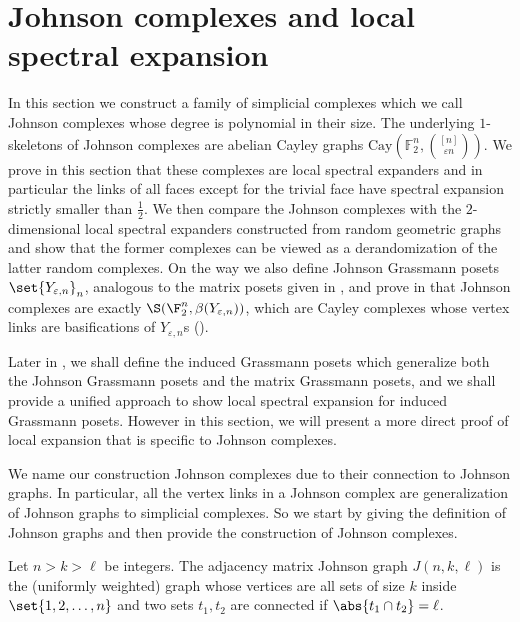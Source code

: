 \newcommand{\0}[0]{\mathbf{0}}
\newcommand{\ot}[0]{\cap}
\newcommand{\co}[1]{C_{#1}} 
\newcommand{\sym}[1]{T_{#1}} 
\newcommand{\oco}[1]{\overline{C_{#1}}} 
\newcommand{\ol}[1]{\overline{#1}}
\newcommand{\cd}[1]{c_{#1}}
\newcommand{\dc}[1]{T_{#1}}


\section{Johnson complexes and local spectral expansion}
\label{sec:spectral-Johnson}
In this section we construct a family of simplicial complexes which we call Johnson complexes whose degree is polynomial in their size. 
The underlying $1$-skeletons of Johnson complexes are abelian Cayley graphs $\mathrm{Cay}(\mathbb{F}_2^n, \binom{[n]}{\varepsilon n})$. 
We prove in this section that these complexes are local spectral expanders and in particular the links of all faces except for the trivial face have spectral expansion strictly smaller than $\frac{1}{2}$.
%
We then compare the Johnson complexes with the $2$-dimensional local spectral expanders constructed from random geometric graphs \cite{LiuMSY2023} and show that the former complexes can be viewed as a derandomization of the latter random complexes.
%
On the way we also define Johnson Grassmann posets $\set{Y_{\varepsilon,n}}_n$, analogous to the matrix posets given in , and prove in  that Johnson complexes are exactly $\S(\F_2^n, \beta(Y_{\varepsilon,n}))$, which are Cayley complexes whose vertex links are basifications of $Y_{\varepsilon,n}$s (). 
\begin{remark}
    Later in , we shall define the induced Grassmann posets which generalize both the Johnson Grassmann posets and the matrix Grassmann posets, and we shall provide a unified approach to show local spectral expansion for induced Grassmann posets. However in this section, we will present a more direct proof of local expansion that is specific to Johnson complexes.
\end{remark}
%
We name our construction Johnson complexes due to their connection to Johnson graphs. In particular, all the vertex links in a Johnson complex are generalization of Johnson graphs to simplicial complexes. So we start by giving the definition of Johnson graphs and then provide the construction of Johnson complexes.


\begin{definition} \label{def:johnson-graph}
    Let \(n>k>\ell\) be integers. The adjacency matrix Johnson graph \(J(n,k,\ell)\) is the (uniformly weighted) graph whose vertices are all sets of size \(k\) inside \(\set{1,2,\dots,n}\) and two sets \(t_1,t_2\) are connected if \(\abs{t_1 \cap t_2} = \ell\).
\end{definition}

